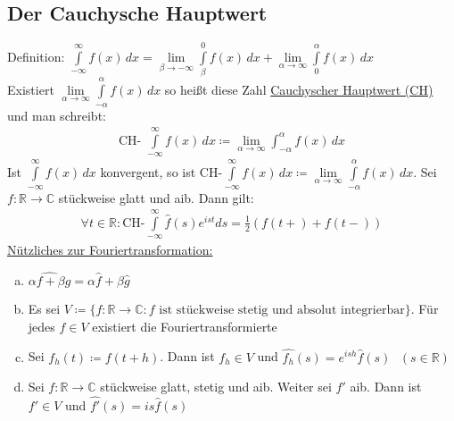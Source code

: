 \subsection{Der Cauchysche Hauptwert}
Definition: $ \int \limits_{-\infty}^\infty f(x)\,dx= \lim \limits_{\beta \to - \infty} \int \limits_\beta^0 f(x)\,dx + \lim \limits_{\alpha \to \infty} \int \limits_0^\alpha f(x)\,dx$ \\
Existiert $\lim \limits_{\alpha \to \infty} \int \limits_{-\alpha}^\alpha f(x)\,dx$ so heißt diese Zahl \underline{Cauchyscher Hauptwert (CH)} und man schreibt: 
\begin{align*}
    \text{CH- } \int \limits_{- \infty}^\infty f(x)\,dx \coloneqq \lim \limits_{\alpha \to \infty} \int_{-\alpha}^\alpha f(x)\,dx
\end{align*}
Ist $\int \limits_{-\infty}^{\infty} f(x)\,dx$ konvergent, so ist $\text{CH-} \int \limits_{-\infty}^\infty f(x)\,dx \coloneqq \lim \limits_{\alpha \to \infty} \int \limits_{-\alpha}^\alpha f(x)\,dx$.
Sei $f: \mathbb{R} \to \mathbb{C}$ stückweise glatt und aib. Dann gilt:
\begin{align*}
    \forall t \in \mathbb{R}: \text{CH-}\int \limits_{-\infty}^\infty \widehat{f}(s)e^{ist} ds = \frac{1}{2} (f(t+) + f(t-))
\end{align*}
\underline{Nützliches zur Fouriertransformation:}
\begin{enumerate} [a)]
    \item $\widehat{\alpha f + \beta g} = \alpha \widehat{f} + \beta \widehat{g}$
    \item Es sei $V \coloneqq \{ f: \mathbb{R} \to \mathbb{C}: f \text{ ist stückweise stetig und absolut integrierbar}\}$. Für jedes $f \in V$ existiert die Fouriertransformierte
    \item Sei $f_h(t) \coloneqq f(t+h)$. Dann ist $f_h \in V$ und $\widehat{f_h}(s) = e^{ish} \widehat{f}(s) \text{ } (s \in \mathbb{R})$
    \item Sei $f: \mathbb{R} \to \mathbb{C}$ stückweise glatt, stetig und aib. Weiter sei $f'$ aib. Dann ist $f' \in V$ und $\widehat{f'}(s) = is\widehat{f}(s)$
\end{enumerate}

